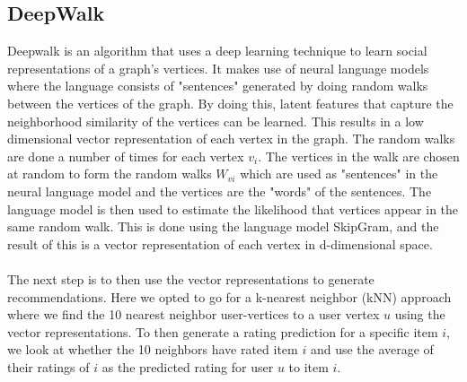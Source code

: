 \subsection{DeepWalk}
Deepwalk is an algorithm that uses a deep learning technique to learn social representations of a graph's vertices\cite{DeepWalk}.
It makes use of neural language models where the language consists of "sentences" generated by doing random walks between the vertices of the graph.
By doing this, latent features that capture the neighborhood similarity of the vertices can be learned.
This results in a low dimensional vector representation of each vertex in the graph.
The random walks are done a number of times for each vertex $v_i$.
The vertices in the walk are chosen at random to form the random walks $W_{vi}$ which are used as "sentences" in the neural language model and the vertices are the "words" of the sentences.
The language model is then used to estimate the likelihood that vertices appear in the same random walk.
This is done using the language model SkipGram, and the result of this is a vector representation of each vertex in d-dimensional space.
\\\\
The next step is to then use the vector representations to generate recommendations.
Here we opted to go for a k-nearest neighbor (kNN) approach where we find the 10 nearest neighbor user-vertices to a user vertex $u$ using the vector representations.
To then generate a rating prediction for a specific item $i$, we look at whether the 10 neighbors have rated item $i$ and use the average of their ratings of $i$ as the predicted rating for user $u$ to item $i$.